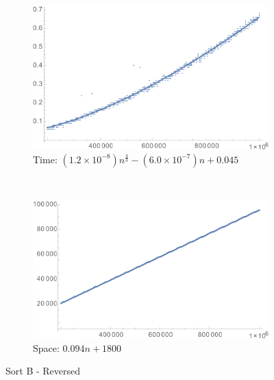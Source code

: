 \documentclass[a4paper]{scrartcl}
\begin{document}
\begin{figure}[p]
    \centering
    \begin{subfigure}[b]{0.45\textwidth}
        \includegraphics[width = \textwidth]{sortB_reverse_time.png}
        \caption{Time: \((1.2 \times 10^{-8}) n^\frac43 - (6.0 \times 10^{-7}) n + 0.045\)}
    \end{subfigure}
    ~
    \begin{subfigure}[b]{0.45\textwidth}
        \includegraphics[width = \textwidth]{sortB_reverse_space.png}
        \caption{Space: \(0.094 n + 1800\)}
    \end{subfigure}
    \caption{Sort B - Reversed}
    \label{fig:sortB_reverse}
\end{figure}
\end{document}
